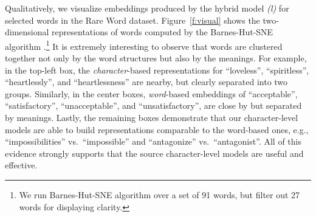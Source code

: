 \documentclass[11pt]{article}
\newcommand{\word}[1]{``#1''}
\newcommand{\model}{{\it (l)}}
\begin{document}
Qualitatively, we visualize embeddings produced by the hybrid model \model{} for
selected words in the Rare Word dataset.
Figure~\ref{f:visual} shows the two-dimensional representations of words
computed by the
Barnes-Hut-SNE algorithm \cite{bhsne}.\footnote{We run Barnes-Hut-SNE algorithm
over a set of 91 words, but filter out 27 words for displaying clarity.} It is extremely interesting to observe that
words are clustered together not only by the word structures but also by
the meanings. For example, in the top-left box,
the {\it character}-based representations for \word{loveless}, \word{spiritless}, \word{heartlessly}, and \word{heartlessness} are nearby,
but clearly separated into two groups. Similarly, in the center boxes, {\it
word}-based embeddings of
\word{acceptable}, \word{satisfactory}, \word{unacceptable}, and \word{unsatisfactory}, are
close by but separated by meanings. Lastly, the remaining boxes demonstrate that our
character-level models are able to build representations comparable to the
word-based ones, e.g., \word{impossibilities} vs.\ \word{impossible} and \word{antagonize}
vs.\ \word{antagonist}. All of this evidence strongly supports that the source
character-level models are useful and effective.
\end{document}
